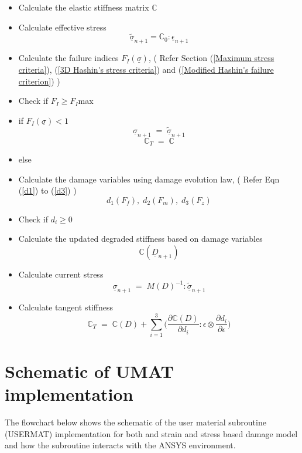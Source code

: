 \documentclass[a4paper,12pt,twoside]{report}
\begin{document}
\begin{itemize}
\item Calculate the elastic stiffness matrix  \textbf{$\mathbb{C}$}
\item Calculate effective stress \textbf{$$\underline{\tilde{\sigma}}_{n+1} = \mathbb{C}_{0} : \underline{\epsilon}_{n+1} $$}
\item Calculate the failure indices \textbf{$F_{I}(\underline{\sigma})$},\;\; ( Refer Section (\ref{Maximum stress criteria}), (\ref{3D Hashin's stress criteria}) and (\ref{Modified Hashin's failure criterion}) )
\item[] Check if $F_{I} \geq F_{I}$max
\item if \textbf{$F_{I}(\underline{\sigma})<1$} \textbf{$$\underline{\sigma}_{n+1} \; = \; \underline{\tilde{\sigma}}_{n+1} $$} \textbf{$$\mathbb{C}_{T} \; = \; \mathbb{C}$$}
\item else
   	
\item[]  Calculate the damage variables using damage evolution law, \;\; ( Refer Eqn (\ref{d1}) to (\ref{d3}) )  \textbf{$$d_{1}(F_{f}),\;d_{2}(F_{m}),\;d_{3}(F_{z})$$}  	
\item[]  Check if $d_{i} \geq 0 $ 
\item[]  Calculate the updated degraded stiffness based on damage variables \textbf{$$\mathbb{C}(\underline{D}_{n+1})$$}
\item[]  Calculate current stress  \textbf{$$\underline{\sigma}_{n+1} \; = \;  M(D)^{-1}:\underline{\tilde{\sigma}}_{n+1} $$}
\item[] Calculate tangent stiffness \textbf{$$\mathbb{C}_{T}  \; = \;\mathbb{C}(D) + \sum_{i = 1}^{3} \Big( \frac{\partial \mathbb{C}(D) }{\partial d_{i}} : \epsilon \otimes \frac{\partial d_{i}}{\partial \epsilon }\Big)$$}
	
\end{itemize} 

\newpage
\section{Schematic of UMAT implementation}
\indent\indent\indent The flowchart below shows the schematic of the user material subroutine (USERMAT) implementation for both and strain and stress based damage model and how the subroutine interacts with the ANSYS environment.
\end{document}
